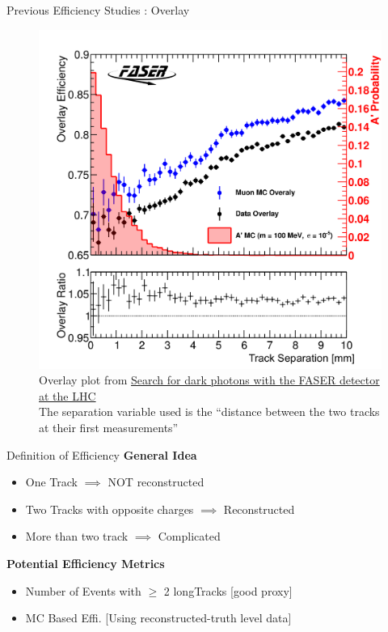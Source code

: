 \begin{frame}{Previous Efficiency Studies : Overlay}
	\begin{figure}
		\includegraphics[height=0.7 \textheight]{./assets/OverlayTracks.png}
        \caption{ Overlay plot from \href{https://cds.cern.ch/record/2864686/plots}{Search for dark photons with the FASER detector at the LHC}\\ The separation variable used is the ``distance between the two tracks at their first measurements''}
	\end{figure}
\end{frame}


\begin{frame}{Definition of Efficiency}
    \textbf{General Idea}
	\begin{itemize}

        \item One Track $\implies$ NOT reconstructed
        \item Two Tracks with opposite charges $\implies$ Reconstructed 
        \item More than two track $\implies$ Complicated
    \end{itemize}
    \vspace{1 cm}
    \textbf{Potential Efficiency Metrics}
    \begin{itemize}
        \item Number of Events with $\geq$ 2 longTracks [good proxy]
        \item MC Based Effi. [Using reconstructed-truth level data]
    \end{itemize}
\end{frame}


